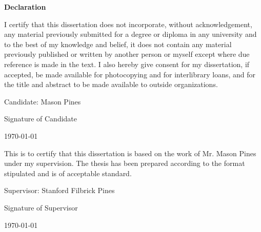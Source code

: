 \begin{center}
\textbf{\Large{Declaration}}
\end{center}
\vspace{0.7cm}
\par
I certify that this dissertation does not incorporate, without acknowledgement, any material previously submitted for a degree or diploma in any university and to the best of my knowledge and belief, it does not contain any material previously published or written by another person or myself except where due reference is made in the text. I also hereby give consent for my dissertation, if accepted, be made available for photocopying and for interlibrary loans, and for the title and abstract to be made available to outside organizations.

\vspace{0.5cm}
\noindent
Candidate: Mason Pines

\vspace{2cm}
\noindent
Signature of Candidate 

\noindent
\today

\vspace{2cm}
This is to certify that this dissertation is based on the work of Mr. Mason Pines under my supervision. The thesis has been prepared according to the format stipulated and is of acceptable standard.

\vspace{0.5cm}
\noindent
Supervisor: Stanford Filbrick Pines

\vspace{2 cm}
\noindent
Signature of Supervisor

\noindent
\today

